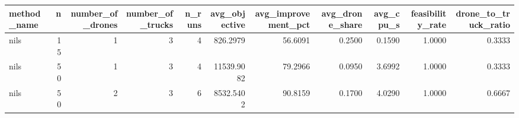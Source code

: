 \begin{tabular}{lrrrrrrrrrr}
\toprule
method_name & n & number_of_drones & number_of_trucks & n_runs & avg_objective & avg_improvement_pct & avg_drone_share & avg_cpu_s & feasibility_rate & drone_to_truck_ratio \\
\midrule
nils & 15 & 1 & 3 & 4 & 826.2979 & 56.6091 & 0.2500 & 0.1590 & 1.0000 & 0.3333 \\
nils & 50 & 1 & 3 & 4 & 11539.9082 & 79.2966 & 0.0950 & 3.6992 & 1.0000 & 0.3333 \\
nils & 50 & 2 & 3 & 6 & 8532.5402 & 90.8159 & 0.1700 & 4.0290 & 1.0000 & 0.6667 \\
\bottomrule
\end{tabular}
